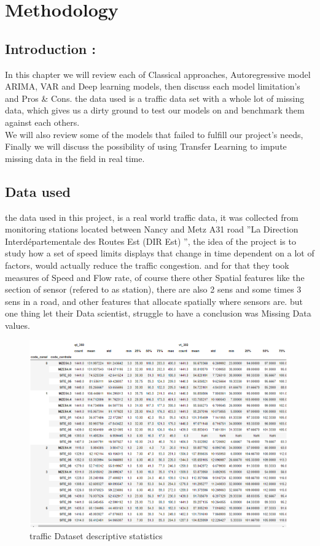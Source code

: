 \chapter{Methodology} \label{ML}

\section{Introduction :}\label{contextofimp}
In this chapter we will review each of Classical approaches, Autoregressive model ARIMA, VAR and Deep learning models, then discuss each model  limitation's and Pros & Cons.
the data used is a traffic data set with a whole lot of missing data, which gives us a dirty ground to test our models on and benchmark them against each others.\\We will also review some of the models that failed to fulfill our project's needs, Finally we will discuss the possibility of using Transfer Learning to impute missing data in the field in real time.



\section{Data used}
the  data used in this project, is a real world traffic data, it was collected from  monitoring stations located between Nancy and  Metz  A31  road ''La Direction Interdépartementale des Routes Est (DIR Est) '', the idea of the project is to study  how  a set of speed limits displays that change in time dependent on a lot of factors, would actually reduce the traffic congestion.
and for that they took measures of Speed and Flow rate, of course there other Spatial features like the section of sensor (refered to as station), there are also 2 sens and some times 3 sens in a road, and other features that allocate spatially where sensors are.
but one thing let their Data scientist, struggle to have a conclusion was Missing Data values.


\begin{figure}[H]
\centering
\includegraphics[scale=.53]{img/grouped_data_descriptives.png} 
\caption{traffic Dataset descriptive statistics}
\label{fig:score}
\end{figure}


